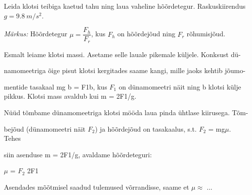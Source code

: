 
Leida klotsi teibiga kaetud tahu ning laua vaheline hõõrdetegur.
Raskuskiirendus $g = \SI{9,8}{m/s^2}$.

\textit{Märkus:} Hõõrdetegur $\mu = \dfrac{F_h}{F_r}$, kus $F_h$ on hõõrdejõud
ning $F_r$ rõhumisjõud.

\hint

\solu
Esmalt leiame klotsi massi. Asetame selle lauale pikemale küljele. Konksust dü-

namomeetriga õige pisut klotsi kergitades saame kangi, mille jaoks kehtib jõumo-

mentide tasakaal mg b = F1b, kus $F_1$ on dünamomeetri näit ning b klotsi külje pikkus. Klotsi mass avaldub kui m = 2F1/g.

Nüüd tõmbame dünamomeetriga klotsi mööda laua pinda ühtlase kiirusega. Tõm-

bejõud (dünamomeetri näit $F_2$) ja hõõrdejõud on tasakaalus, s.t. $F_2$ = mg$\mu$. Tehes

siin asenduse m = 2F1/g, avaldame hõõrdeteguri:

$\mu$ = $F_2$ 2F1

Asendades mõõtmisel saadud tulemused võrrandisse, saame et $\mu \approx$ ...
\probend
